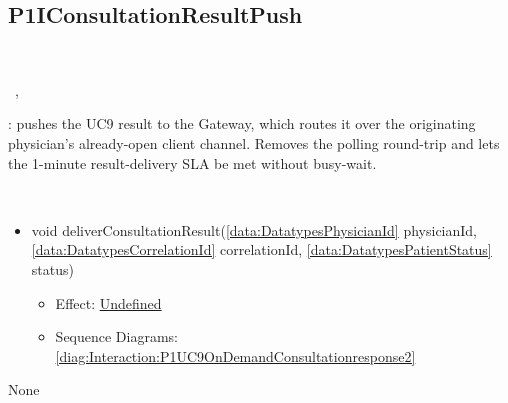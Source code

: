   \subsection{P1IConsultationResultPush}\label{int:InterfacesP1IConsultationResultPush}
    \begin{description}
      \item[Provided by:] \iconcomponent{}~
      \item[Required by:] \iconcomponent{}~, \iconcomponent{}~ 
           \item[Description]:  pushes the UC9 result to the Gateway, which routes it over the originating physician's already-open client channel. Removes the polling round-trip and lets the 1-minute result-delivery SLA be met without busy-wait.
      \item[Operations:] ~
    \begin{itemize}[noitemsep,nolistsep,leftmargin=-.25cm]
      \item \textsf{void deliverConsultationResult(\ref{data:DatatypesPhysicianId} physicianId, \ref{data:DatatypesCorrelationId} correlationId, \ref{data:DatatypesPatientStatus} status)}
        \begin{itemize}[noitemsep,nolistsep]
           \item Effect: {\colorbox{red!30}{\underline{Undefined}}} 
           \item Sequence Diagrams: \cref{diag:Interaction:P1UC9OnDemandConsultationresponse2}
        \end{itemize}
    \end{itemize}
      \item[Diagrams:] None
    \end{description}

